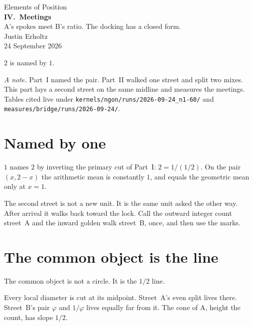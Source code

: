 \documentclass[10pt,a4paper]{article}
\theoremstyle{plain}
\theoremstyle{definition}
\theoremstyle{remark}
\begin{document}
\begin{center}
\vspace*{1.8em}
{\large Elements of Position}\\[1.4em]
{\LARGE\bfseries IV.\ Meetings}\\[0.4em]
{\small A's spokes meet B's ratio. The docking has a closed form.}\\[1.4em]
{\normalsize Justin Erholtz}\\[0.3em]
{\small 24 September 2026}
\end{center}

\vspace{1.0em}

\begin{center}
{\large \(2\) is named by \(1\).}
\end{center}

\vspace{0.8em}

\noindent
\textit{A note.}
Part~I named the pair.
Part~II walked one street and split two mixes.
This part lays a second street on the same midline and measures the meetings.
Tables cited live under
\texttt{kernels/ngon/runs/2026-09-24\_n1-60/} and
\texttt{measures/bridge/runs/2026-09-24/}.

\tableofcontents

\section{Named by one}

\(1\) names \(2\) by inverting the primary cut of Part~I:
\(2=1/(1/2)\).
On the pair \((x,2-x)\) the arithmetic mean is constantly \(1\), and equals the geometric mean only at \(x=1\).

The second street is not a new unit.
It is the same unit asked the other way.
After arrival it walks back toward the lock.
Call the outward integer count street~A and the inward golden walk street~B, once, and then use the marks.

\section{The common object is the line}

The common object is not a circle.
It is the \(1/2\) line.

Every local diameter is cut at its midpoint.
Street~A's even split lives there.
Street~B's pair \(\varphi\) and \(1/\varphi\) lives equally far from it.
The cone of A, height the count, has slope \(1/2\).
\end{document}
